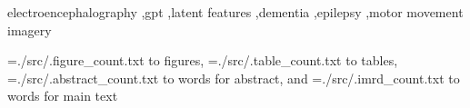 \documentclass[final,3p,times,twocolumn]{elsarticle}
\newcommand\readwordcount[1]{%
  \openin\wordcount=#1
  \read\wordcount to \thewordcount
  \closein\wordcount
  \thewordcount
}
\begin{document}
\begin{frontmatter}
\begin{abstract}
\end{abstract}

\begin{keyword}
electroencephalography \sep gpt \sep latent features \sep dementia \sep epilepsy \sep motor movement imagery
\end{keyword}
\end{frontmatter}

\begin{wordcount*}
\readwordcount{./src/.figure_count.txt} figures, \readwordcount{./src/.table_count.txt} tables, \readwordcount{./src/.abstract_count.txt} words for abstract, and \readwordcount{./src/.imrd_count.txt} words for main text
\end{wordcount*}
\end{document}
